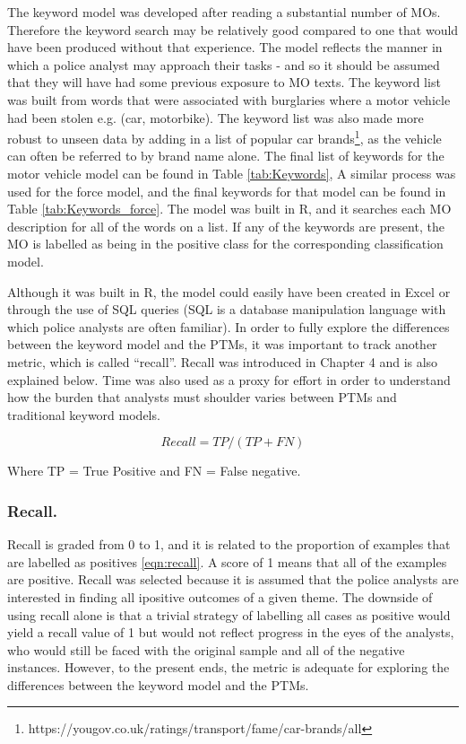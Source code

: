 The keyword model was developed after reading a substantial number of MOs. Therefore the keyword search may be relatively good compared to one that would have been produced without that experience. The model reflects the manner in which a police analyst may approach their tasks - and so it should be assumed that they will have had some previous exposure to MO texts. The keyword list was built from words that were associated with burglaries where a motor vehicle had been stolen e.g. (car, motorbike). The keyword list was also made more robust to unseen data by adding in a list of popular car brands\footnote{https://yougov.co.uk/ratings/transport/fame/car-brands/all}, as the vehicle can often be referred to by brand name alone. The final list of keywords for the motor vehicle model can be found in Table \ref{tab:Keywords}, A similar process was used for the force model, and the final keywords for that model can be found in Table \ref{tab:Keywords_force}. The model was built in R, and it searches each MO description for all of the words on a list. If any of the keywords are present, the MO is labelled as being in the positive class for the corresponding classification model.

Although it was built in R, the model could easily have been created in Excel or through the use of SQL queries (SQL is a database manipulation language with which police analysts are often familiar). In order to fully explore the differences between the keyword model and the PTMs, it was important to track another metric, which is called “recall”. Recall was introduced in Chapter 4 and is also explained below. Time was also used as a proxy for effort in order to understand how the burden that analysts must shoulder varies between PTMs and traditional keyword models.

\begin{equation}
 Recall = TP / (TP + FN)
 \label{eqn:recall}
\end{equation}

Where TP = True Positive and FN = False negative.
\subsubsection{Recall.} Recall is graded from 0 to 1, and it is related to the proportion of examples that are labelled as positives \ref{eqn:recall}. A score of 1 means that all of the examples are positive. Recall was selected because it is assumed that the police analysts are interested in finding all ipositive outcomes of a given theme. The downside of using recall alone is that a trivial strategy of labelling all cases as positive would yield a recall value of 1 but would not reflect progress in the eyes of the analysts, who would still be faced with the original sample and all of the negative instances. However, to the present ends, the metric is adequate for exploring the differences between the keyword model and the PTMs.


